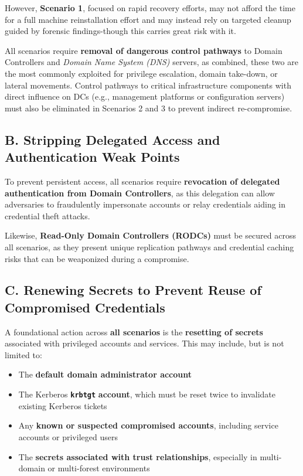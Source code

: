 However, \textbf{Scenario 1}, focused on rapid recovery efforts, may not afford the time for a full machine reinstallation effort and may instead rely on targeted cleanup guided by forensic findings-though this carries great risk with it.

All scenarios require \textbf{removal of dangerous control pathways} to Domain Controllers and \textit{Domain Name System (DNS)} servers, as combined, these two are the most commonly exploited for privilege escalation, domain take-down, or lateral movements. Control pathways to critical infrastructure components with direct influence on DCs (e.g., management platforms or configuration servers) must also be eliminated in Scenarios 2 and 3 to prevent indirect re-compromise.

\subsection{B. Stripping Delegated Access and Authentication Weak Points}
To prevent persistent access, all scenarios require \textbf{revocation of delegated authentication from Domain Controllers}, as this delegation can allow adversaries to fraudulently impersonate accounts or relay credentials aiding in credential theft attacks.

Likewise, \textbf{Read-Only Domain Controllers (RODCs)} must be secured across all scenarios, as they present unique replication pathways and credential caching risks that can be weaponized during a compromise.

\subsection{C. Renewing Secrets to Prevent Reuse of Compromised Credentials}

A foundational action across \textbf{all scenarios} is the \textbf{resetting of secrets} associated with privileged accounts and services. This may include, but is not limited to:
\begin{itemize}
    \item The \textbf{default domain administrator account}
    \item The Kerberos \texttt{\textbf{krbtgt}} \textbf{account}, which must be reset twice to invalidate existing Kerberos tickets
    \item Any \textbf{known or suspected compromised accounts}, including service accounts or privileged users
    \item The \textbf{secrets associated with trust relationships}, especially in multi-domain or multi-forest environments
\end{itemize}

